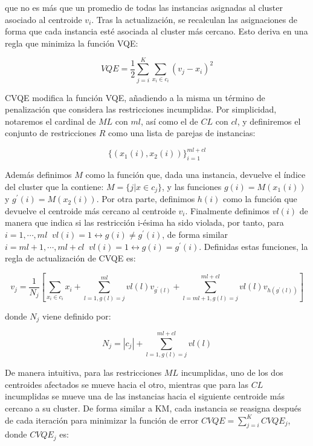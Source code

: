 que no es más que un promedio de todas las instancias asignadas al cluster asociado al centroide $v_i$. Tras la actualización, se recalculan las asignaciones de forma que cada instancia esté asociada al cluster más cercano. Esto deriva en una regla que minimiza la función \acf{VQE}:

\begin{equation}
VQE = \frac{1}{2} \sum_{j = i}^{K} \sum_{x_i \in c_i} (v_j - x_i)^2
\label{eqn28}
\end{equation}

\acs{CVQE} modifica la función \acs{VQE}, añadiendo a la misma un término de penalización que considera las restricciones incumplidas. Por simplicidad, notaremos el cardinal de $ML$ con $ml$, así como el de $CL$ con $cl$, y definiremos el conjunto de restricciones $R$ como una lista de parejas de instancias: 

\begin{equation}
\{(x_1(i), x_2(i))\}_{i=1}^{ml+cl}
\label{eqn29}
\end{equation}

Además definimos $M$ como la función que, dada una instancia, devuelve el índice del cluster que la contiene: $M = \{j | x \in c_j\}$, y las funciones $g(i) = M(x_1(i))$ y $g^\prime(i) = M(x_2(i))$. Por otra parte, definimos $h(i)$ como la función que devuelve el centroide más cercano al centroide $v_i$. Finalmente definimos $vl(i)$ de manera que indica si las restricción i-ésima ha sido violada, por tanto, para $i = 1, \cdots , ml \;\; vl(i) = 1 \leftrightarrow g(i) \neq g^\prime(i)$, de forma similar $i = ml + 1, \cdots , ml + cl \;\; vl(i) = 1 \leftrightarrow g(i) = g^\prime(i)$. Definidas estas funciones, la regla de actualización de \acs{CVQE} es:

\begin{equation}
v_j = \frac{1}{N_j} \left[ \sum_{x_i \in c_i}x_i + 
\sum_{l=1,g(l) = j}^{ml} vl(l) v_{g^\prime(l)} + 
\sum_{l=ml + 1,g(l) = j}^{ml + cl} vl(l) v_{h(g^\prime(l))}
\right]
\label{eqn30}
\end{equation}

donde $N_j$ viene definido por: 

\begin{equation}
N_j = |c_j| + \sum_{l=1,g(l) = j}^{ml + cl} vl(l)
\label{eqn31}
\end{equation}

De manera intuitiva, para las restricciones $ML$ incumplidas, uno de los dos centroides afectados se mueve hacia el otro, mientras que para las $CL$ incumplidas se mueve una de las instancias hacia el siguiente centroide más cercano a su cluster. De forma similar a \acs{KM}, cada instancia se reasigna después de cada iteración para minimizar la función de error $CVQE = \sum_{j=i}^{K} CVQE_j$, donde $CVQE_j$ es:

